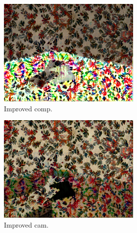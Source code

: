 \begin{figure}[]
\begin{subfigure}{\textwidth}
        \begin{subfigure}{0.24\textwidth}
            \centering
            \includegraphics[width=\textwidth]{images/04-experiment02/sofa/flowers/improved_im.jpg}
            \caption*{Improved comp.}
        \end{subfigure}
        \hfill
        \begin{subfigure}{0.24\textwidth}
            \centering
            \includegraphics[width=\textwidth]{images/04-experiment02/sofa/flowers/improved_proj.jpg}
            \caption*{Improved cam.}
        \end{subfigure}
        \hfill
        \begin{subfigure}{0.24\textwidth}
            \centering

\end{subfigure}
\end{subfigure}
\end{figure}
